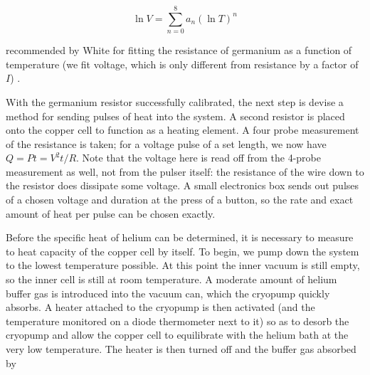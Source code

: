 \begin{equation}
\label{eq:fiteqn}
\ln{V} = \sum_{n=0}^{8} a_{n} (\ln{T})^{n}
\end{equation}

recommended by White for fitting the resistance of germanium as a function of temperature (we fit voltage, which is only different from resistance by a factor of $I$) \cite[p.~140]{white}.

With the germanium resistor successfully calibrated, the next step is devise a method for sending pulses of heat into the system. A second resistor is placed onto the copper cell to function as a heating element. A four probe measurement of the resistance is taken; for a voltage pulse of a set length, we now have $Q = P t = V^{2} t / R$. Note that the voltage here is read off from the 4-probe measurement as well, not from the pulser itself: the resistance of the wire down to the resistor does dissipate some voltage. A small electronics box sends out pulses of a chosen voltage and duration at the press of a button, so the rate and exact amount of heat per pulse can be chosen exactly.

Before the specific heat of helium can be determined, it is necessary to measure to heat capacity of the copper cell by itself. To begin, we pump down the system to the lowest temperature possible. At this point the inner vacuum is still empty, so the inner cell is still at room temperature. A moderate amount of helium buffer gas is introduced into the vacuum can, which the cryopump quickly absorbs. A heater attached to the cryopump is then activated (and the temperature monitored on a diode thermometer next to it) so as to desorb the cryopump and allow the copper cell to equilibrate with the helium bath at the very low temperature. The heater is then turned off and the buffer gas absorbed by 